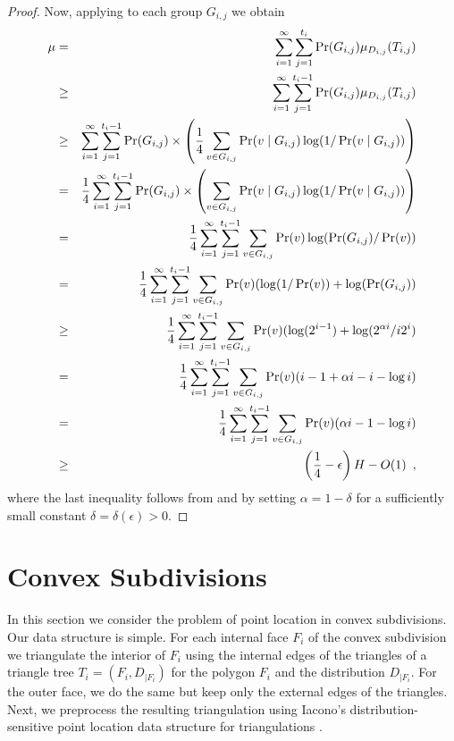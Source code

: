 \documentclass[charterfonts,lotsofwhite]{patmorin}
\begin{document}
\begin{proof}
Now, applying  to each group $G_{i,j}$ 
we obtain
\begin{eqnarray*}
\mu & = & \sum_{i=1}^{\infty}\sum_{j=1}^{t_i}
	\Pr(G_{i,j})\mu_{D_{i,j}}(T_{i,j}) \\
& \ge & \sum_{i=1}^{\infty}\sum_{j=1}^{t_i-1}
	\Pr(G_{i,j})\mu_{D_{i,j}}(T_{i,j}) \\
& \ge & \sum_{i=1}^{\infty}\sum_{j=1}^{t_i-1}\Pr(G_{i,j})\times
	\left(\frac{1}{4}
	\sum_{v\in G_{i,j}}\Pr(v\mid G_{i,j})\log(1/\Pr(v\mid G_{i,j}))
	\right) \\
& = & \frac{1}{4}\sum_{i=1}^{\infty}\sum_{j=1}^{t_i-1}\Pr(G_{i,j})\times
	\left(
	\sum_{v\in G_{i,j}}\Pr(v\mid G_{i,j})\log(1/\Pr(v\mid G_{i,j}))
	\right) \\
& = & \frac{1}{4}\sum_{i=1}^{\infty}\sum_{j=1}^{t_i-1}
	\sum_{v\in G_{i,j}}\Pr(v)\log(\Pr(G_{i,j})/\Pr(v)) \\
& = & \frac{1}{4}\sum_{i=1}^{\infty}\sum_{j=1}^{t_i-1}
	\sum_{v\in G_{i,j}}\Pr(v)(\log(1/\Pr(v))+ \log(\Pr(G_{i,j})) \\
& \ge & \frac{1}{4}\sum_{i=1}^{\infty}\sum_{j=1}^{t_i-1}
	\sum_{v\in G_{i,j}}\Pr(v)(\log(2^{i-1}) + \log(2^{\alpha i}/i2^{i}) \\
& = & \frac{1}{4}\sum_{i=1}^{\infty}\sum_{j=1}^{t_i-1}
	\sum_{v\in G_{i,j}}\Pr(v)(i-1 + \alpha i -i -\log i) \\
& = & \frac{1}{4}\sum_{i=1}^{\infty}\sum_{j=1}^{t_i-1}
	\sum_{v\in G_{i,j}}\Pr(v)(\alpha i  -1 -\log i) \\
\comment{
& \ge & \frac{1}{4}\sum_{i=1}^{\infty}\sum_{j=1}^{t_i-1}
	\sum_{v\in G_{i,j}}\Pr(v)(i/4 - 3) \\
& \ge & \left(\frac{1}{24}\sum_{i=1}^{\infty}\sum_{j=1}^{t_i-1}
	\sum_{v\in G_{i,j}}\Pr(v)\log (1/\Pr(v))\right)-4 \\
}
& \ge & \left(\frac{1}{4}-\epsilon\right)H - O(1)  \enspace ,
\end{eqnarray*}
where the last inequality follows from  and by setting
$\alpha = 1-\delta$ for a sufficiently small constant
$\delta=\delta(\epsilon) > 0$.
\end{proof}

\section{Convex Subdivisions}

In this section we consider the problem of point location in convex
subdivisions. Our data structure is simple.  For each internal face
$F_i$ of the convex subdivision we triangulate the interior of $F_i$
using the internal edges of the triangles of a triangle tree
$T_i=(F_i,D_{|F_i})$ for the polygon $F_i$ and the distribution
$D_{|F_i}$. For the outer face, we do the same but keep only the
external edges of the triangles.  Next, we preprocess the resulting
triangulation using Iacono's distribution-sensitive point location
data structure for triangulations \cite{i01}.
\end{document}
